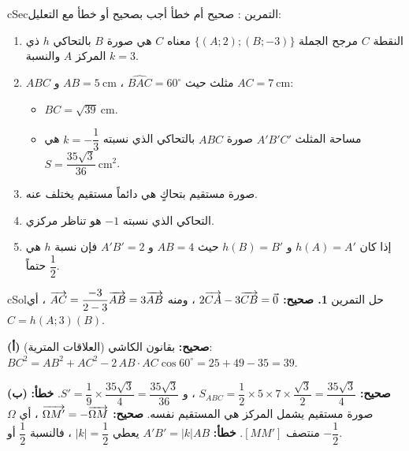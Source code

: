 \documentclass[12pt,a4paper]{article}
\newenvironment{BOX}[2]{\begin{otherlanguage}{english}\begin{arbox}{#1}{#2}}{\end{arbox}\end{otherlanguage}}
\newcounter{exo}
\newenvironment{tamrin}[1]{\stepcounter{exo}\begin{BOX}{cSec}{التمرين \theexo: #1}}{\end{BOX}}
\newenvironment{hal}{\Needspace{12\baselineskip}\begin{otherlanguage}{english}\begin{arbox}[breakable]{cSol}{حل التمرين \theexo}}{\end{arbox}\end{otherlanguage}}
\newenvironment{sq}{\begin{itemize}[leftmargin=2.4em,itemsep=3pt]}{\end{itemize}}
\newcommand{\qa}{\item[(أ)]}\newcommand{\qb}{\item[(ب)]}\newcommand{\qc}{\item[(جـ)]}\newcommand{\qd}{\item[(د)]}\newcommand{\qe}{\item[(هـ)]}
\newcommand{\pa}{\par\smallskip\textbf{(أ)} }\newcommand{\pb}{\par\smallskip\textbf{(ب)} }\newcommand{\pc}{\par\smallskip\textbf{(جـ)} }\newcommand{\pd}{\par\smallskip\textbf{(د)} }\newcommand{\pe}{\par\smallskip\textbf{(هـ)} }
\begin{document}
\begin{tamrin}{صحيح أم خطأ}
أجب بصحيح أو خطأ مع التعليل:
\begin{enumerate}
\item النقطة $C$ مرجح الجملة $\{(A;2);(B;-3)\}$ معناه $C$ هي صورة $B$ بالتحاكي $h$ ذي المركز $A$ والنسبة $k=3$.
\item $ABC$ مثلث حيث $\widehat{BAC}=60^\circ$ ، $AB=5\ \text{cm}$ و $AC=7\ \text{cm}$:
\begin{sq}
\qa $BC=\sqrt{39}\ \text{cm}$.
\qb مساحة المثلث $A'B'C'$ صورة $ABC$ بالتحاكي الذي نسبته $k=-\dfrac13$ هي $S=\dfrac{35\sqrt3}{36}\ \text{cm}^2$.
\end{sq}
\item صورة مستقيم بتحاكٍ هي دائماً مستقيم يختلف عنه.
\item التحاكي الذي نسبته $-1$ هو تناظر مركزي.
\item إذا كان $h(A)=A'$ و $h(B)=B'$ حيث $AB=4$ و $A'B'=2$ فإن نسبة $h$ هي حتماً $\dfrac12$.
\end{enumerate}
\end{tamrin}
\begin{hal}
\textbf{1. صحيح:} $2\overrightarrow{CA}-3\overrightarrow{CB}=\vec0$ ، ومنه $\overrightarrow{AC}=\dfrac{-3}{2-3}\overrightarrow{AB}=3\overrightarrow{AB}$ ، أي $C=h(A;3)(B)$.
 \pa \textbf{صحيح:} بقانون الكاشي (العلاقات المترية): $BC^2=AB^2+AC^2-2\,AB\cdot AC\cos60^\circ=25+49-35=39$.
\pb \textbf{صحيح:} $S_{ABC}=\dfrac12\times5\times7\times\dfrac{\sqrt3}{2}=\dfrac{35\sqrt3}{4}$ ، و $S'=\dfrac19\times\dfrac{35\sqrt3}{4}=\dfrac{35\sqrt3}{36}$.
 \textbf{خطأ:} صورة مستقيم يشمل المركز هي المستقيم نفسه.
 \textbf{صحيح:} $\overrightarrow{\Omega M'}=-\overrightarrow{\Omega M}$ ، أي $\Omega$ منتصف $[MM']$.
 \textbf{خطأ:} $A'B'=|k|AB$ يعطي $|k|=\dfrac12$ ، فالنسبة $\dfrac12$ أو $-\dfrac12$.
\end{hal}

\end{document}
